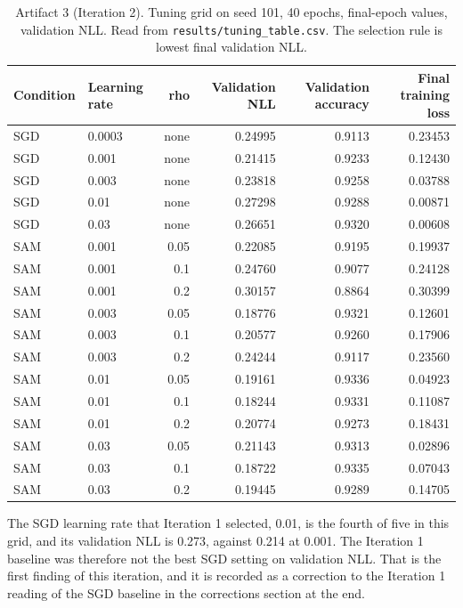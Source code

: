 \documentclass[11pt,letterpaper]{article}
\begin{document}
\begin{table}[!htbp]
\centering
\footnotesize
\caption{Artifact 3 (Iteration 2). Tuning grid on seed 101, 40 epochs, final-epoch values, validation NLL. Read from \texttt{results/tuning\_table.csv}. The selection rule is lowest final validation NLL.}
\label{tab:tune2}
\begin{tabular}{llrrrr}
\toprule
Condition & Learning rate & rho & Validation NLL & Validation accuracy & Final training loss \\
\midrule
SGD & 0.0003 & none & 0.24995 & 0.9113 & 0.23453 \\
SGD & 0.001 & none & 0.21415 & 0.9233 & 0.12430 \\
SGD & 0.003 & none & 0.23818 & 0.9258 & 0.03788 \\
SGD & 0.01 & none & 0.27298 & 0.9288 & 0.00871 \\
SGD & 0.03 & none & 0.26651 & 0.9320 & 0.00608 \\
SAM & 0.001 & 0.05 & 0.22085 & 0.9195 & 0.19937 \\
SAM & 0.001 & 0.1 & 0.24760 & 0.9077 & 0.24128 \\
SAM & 0.001 & 0.2 & 0.30157 & 0.8864 & 0.30399 \\
SAM & 0.003 & 0.05 & 0.18776 & 0.9321 & 0.12601 \\
SAM & 0.003 & 0.1 & 0.20577 & 0.9260 & 0.17906 \\
SAM & 0.003 & 0.2 & 0.24244 & 0.9117 & 0.23560 \\
SAM & 0.01 & 0.05 & 0.19161 & 0.9336 & 0.04923 \\
SAM & 0.01 & 0.1 & 0.18244 & 0.9331 & 0.11087 \\
SAM & 0.01 & 0.2 & 0.20774 & 0.9273 & 0.18431 \\
SAM & 0.03 & 0.05 & 0.21143 & 0.9313 & 0.02896 \\
SAM & 0.03 & 0.1 & 0.18722 & 0.9335 & 0.07043 \\
SAM & 0.03 & 0.2 & 0.19445 & 0.9289 & 0.14705 \\
\bottomrule
\end{tabular}
\end{table}

The SGD learning rate that Iteration 1 selected, 0.01, is the fourth of five in this grid, and its validation NLL is 0.273, against 0.214 at 0.001. The Iteration 1 baseline was therefore not the best SGD setting on validation NLL. That is the first finding of this iteration, and it is recorded as a correction to the Iteration 1 reading of the SGD baseline in the corrections section at the end.
\end{document}
